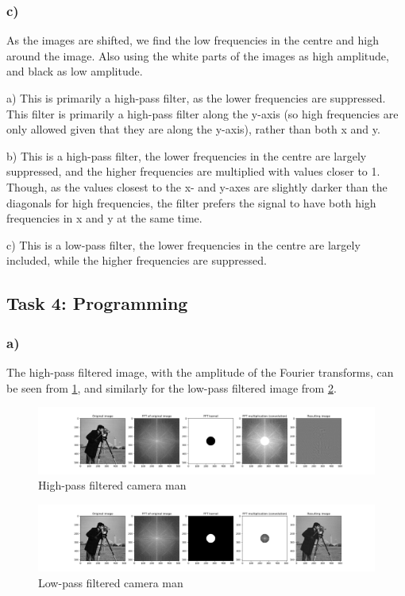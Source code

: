 \subsubsection*{c)}
As the images are shifted, we find the low frequencies in the centre and high around the image. Also using the white parts of the images as high amplitude, and black as low amplitude. 

a)
This is primarily a high-pass filter, as the lower frequencies are suppressed. This filter is primarily a high-pass filter along the y-axis (so high frequencies are only allowed given that they are along the y-axis), rather than both x and y. 

b)
This is a high-pass filter, the lower frequencies in the centre are largely suppressed, and the higher frequencies are multiplied with values closer to 1. Though, as the values closest to the x- and y-axes are slightly darker than the diagonals for high frequencies, the filter prefers the signal to have both high frequencies in x and y at the same time. 

c)
This is a low-pass filter, the lower frequencies in the centre are largely included, while the higher frequencies are suppressed.

\newpage
\subsection{Task 4: Programming}
\subsubsection*{a)}
The high-pass filtered image, with the amplitude of the Fourier transforms, can be seen from \cref{fig:camera_high_pass}, and similarly for the low-pass filtered image from \cref{fig:camera_low_pass}. 

\begin{figure}[]
    \centering
    \includegraphics[width=1.00\textwidth]{figures/image_processed/camera_high_pass_subplots.png}
    \caption{High-pass filtered camera man}
    \label{fig:camera_high_pass}
\end{figure}

\begin{figure}[]
    \centering
    \includegraphics[width=1.00\textwidth]{figures/image_processed/camera_low_pass_subplots.png}
    \caption{Low-pass filtered camera man}
    \label{fig:camera_low_pass}
\end{figure}

